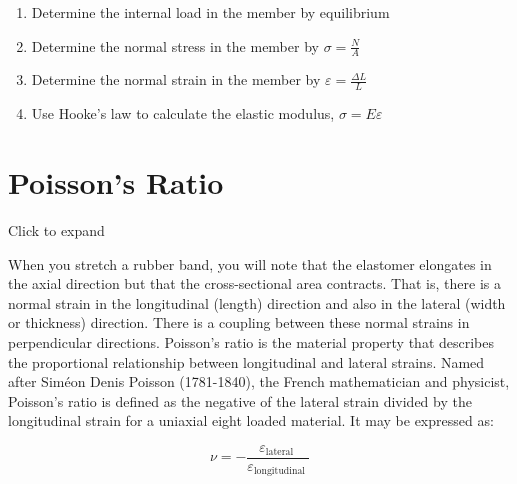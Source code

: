 \documentclass[
  letterpaper,
  DIV=11,
  numbers=noendperiod]{scrreprt}
\providecommand{\tightlist}{%
  \setlength{\itemsep}{0pt}\setlength{\parskip}{0pt}}\usepackage{longtable,booktabs,array}
\begin{document}
\begin{tcolorbox}[enhanced jigsaw, breakable, opacityback=0, toptitle=1mm, left=2mm, colback=white, opacitybacktitle=0.6, colframe=quarto-callout-warning-color-frame, titlerule=0mm, arc=.35mm, leftrule=.75mm, bottomtitle=1mm, colbacktitle=quarto-callout-warning-color!10!white, rightrule=.15mm, title={Step-by-step:}, bottomrule=.15mm, toprule=.15mm, coltitle=black]

\begin{enumerate}
\def\labelenumi{\arabic{enumi}.}
\tightlist
\item
  Determine the internal load in the member by equilibrium
\item
  Determine the normal stress in the member by \(\sigma=\frac{N}{A}\)
\item
  Determine the normal strain in the member by
  \(\varepsilon=\frac{\Delta L}{L}\)
\item
  Use Hooke's law to calculate the elastic modulus,
  \(\sigma=E \varepsilon\)
\end{enumerate}

\end{tcolorbox}

\section{Poisson's Ratio}\label{sec-4.4}

Click to expand

When you stretch a rubber band, you will note that the elastomer
elongates in the axial direction but that the cross-sectional area
contracts. That is, there is a normal strain in the longitudinal
(length) direction and also in the lateral (width or thickness)
direction. There is a coupling between these normal strains in
perpendicular directions. Poisson's ratio is the material property that
describes the proportional relationship between longitudinal and lateral
strains. Named after Siméon Denis Poisson (1781-1840), the French
mathematician and physicist, Poisson's ratio is defined as the negative
of the lateral strain divided by the longitudinal strain for a uniaxial
eight loaded material. It may be expressed as:

\[
\nu=-\frac{\varepsilon_{\text {lateral }}}{\varepsilon_{\text {longitudinal }}}
\]
\end{document}

